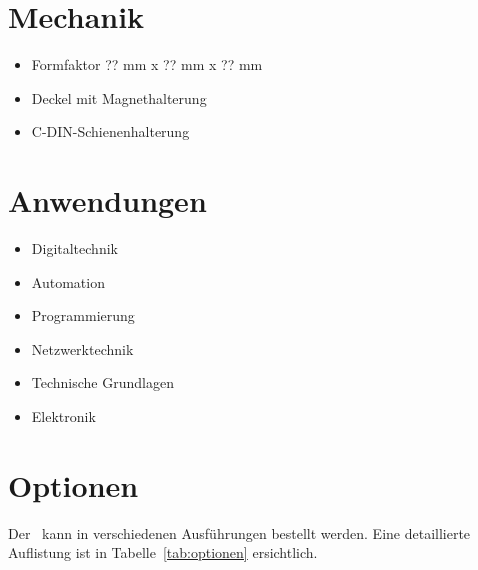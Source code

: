 \documentclass[10pt]{datasheet}
\begin{document}
\section{Mechanik}

\begin{itemize}
    \item Formfaktor ?? mm x ?? mm x ?? mm
    \item Deckel mit Magnethalterung
    \item C-DIN-Schienenhalterung
\end{itemize}

\section{Anwendungen}

\begin{itemize}
    \item Digitaltechnik
    \item Automation
    \item Programmierung
    \item Netzwerktechnik
    \item Technische Grundlagen
    \item Elektronik
\end{itemize}

\vfill\break


\onecolumn

\section{Optionen}
Der \xlhPlattformID\ kann in verschiedenen Ausführungen bestellt werden.
Eine detaillierte Auflistung ist in Tabelle~\ref{tab:optionen} ersichtlich.
\end{document}
